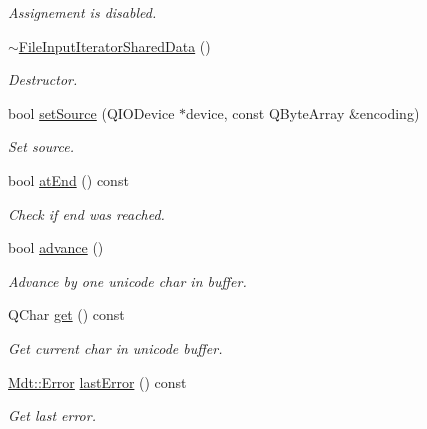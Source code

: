 \begin{DoxyCompactItemize}
\begin{DoxyCompactList}\small\item\em Assignement is disabled. \end{DoxyCompactList}\item 
\hyperlink{class_mdt_1_1_plain_text_1_1_file_input_iterator_shared_data_a5ea699bdb5e6a72c06054e90138a4707}{$\sim$\+File\+Input\+Iterator\+Shared\+Data} ()
\begin{DoxyCompactList}\small\item\em Destructor. \end{DoxyCompactList}\item 
bool \hyperlink{class_mdt_1_1_plain_text_1_1_file_input_iterator_shared_data_afdd5aec3bbdda3e55e11bf8a09c2fbff}{set\+Source} (Q\+I\+O\+Device $\ast$device, const Q\+Byte\+Array \&encoding)
\begin{DoxyCompactList}\small\item\em Set source. \end{DoxyCompactList}\item 
bool \hyperlink{class_mdt_1_1_plain_text_1_1_file_input_iterator_shared_data_a588463721c160b7132b1d8ecbf94e0c3}{at\+End} () const 
\begin{DoxyCompactList}\small\item\em Check if end was reached. \end{DoxyCompactList}\item 
bool \hyperlink{class_mdt_1_1_plain_text_1_1_file_input_iterator_shared_data_a734dd9507b4d12060516c1d37d0d8dc6}{advance} ()
\begin{DoxyCompactList}\small\item\em Advance by one unicode char in buffer. \end{DoxyCompactList}\item 
Q\+Char \hyperlink{class_mdt_1_1_plain_text_1_1_file_input_iterator_shared_data_a95213b7621f220618e8c67bc4f5f7bfc}{get} () const 
\begin{DoxyCompactList}\small\item\em Get current char in unicode buffer. \end{DoxyCompactList}\item 
\hyperlink{class_mdt_1_1_error}{Mdt\+::\+Error} \hyperlink{class_mdt_1_1_plain_text_1_1_file_input_iterator_shared_data_a250ee77491bce6036150de5219e62d32}{last\+Error} () const 
\begin{DoxyCompactList}\small\item\em Get last error. \end{DoxyCompactList}\end{DoxyCompactItemize}


